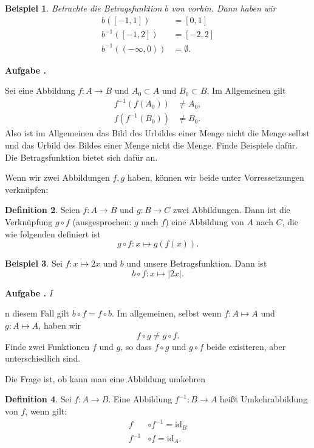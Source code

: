 \documentclass[a4paper,ngerman,12pt]{scrartcl}
\theoremstyle{definition}
\newtheorem{defn}{Definition}[section]
\newtheorem{bsp}[defn]{Beispiel}
\theoremstyle{plain}
\newtheorem{beispiel}[defn]{Beispiel}
\theoremstyle{remark}
\newlength{\aufgabenskip}
\newcounter{aufgabennummer}
\newenvironment{aufgabe}[1]{
  \addtocounter{aufgabennummer}{1}
  \textbf{Aufgabe \theaufgabennummer.} \emph{#1} \par
}{\vspace{\aufgabenskip}}
\begin{document}
\begin{beispiel}
Betrachte die Betragsfunktion $b$ von vorhin. Dann haben wir
\begin{align*}
b([-1,1]) &=  [0,1] \\
b^{-1}([-1,2]) &= [-2,2]\\
b^{-1}((-\infty, 0)) &= \emptyset.
\end{align*}
\end{beispiel}
\begin{aufgabe}\\
Sei eine Abbildung $f:A\longrightarrow B$ und  $A_0\subset A$ und $B_0\subset B$. Im Allgemeinen gilt 
\begin{align*}
f^{-1}\left(f\left(A_0\right)\right) &\neq A_0,\\
f\left(f^{-1}\left(B_0\right)\right) &\neq B_0.
\end{align*}
Also ist im Allgemeinen das Bild des Urbildes einer Menge nicht die Menge selbst und das Urbild des Bildes einer Menge nicht die Menge. Finde Beispiele dafür. Die Betragsfunktion bietet sich dafür an.
\end{aufgabe}

Wenn wir zwei Abbildungen $f,g$ haben, können wir beide unter Vorressetzungen verknüpfen:
\begin{defn}
Seien $f: A\longrightarrow B$ und $g: B\longrightarrow C$ zwei Abbildungen. Dann ist die Verknüpfung $g\circ f$ (ausgesprochen: $g$ nach $f$) eine Abbildung von $A$ nach $C$, die wie folgenden definiert ist
\[
g\circ f: x \mapsto g\left(f(x)\right).
\]
\end{defn}

\begin{bsp}
Sei $f:x\mapsto 2x$ und $b$ und unsere Betragsfunktion. Dann ist
\[
b\circ f: x\mapsto |2x|.
\]
\end{bsp}

\begin{aufgabe}
In diesem Fall gilt $b\circ f = f \circ b$. Im allgemeinen, selbst wenn $f:A\mapsto A$ und $g:A\mapsto A$, haben wir
\[
f\circ g \neq g \circ f.
\]
Finde zwei Funktionen $f$ und $g$, so dass $f\circ g$ und $g\circ f$ beide exisiteren, aber unterschiedlich sind. 
\end{aufgabe}

Die Frage ist, ob kann man eine Abbildung umkehren
\begin{defn}
Sei $f:A\longrightarrow B$. Eine Abbildung $f^{-1}:B\longrightarrow A$ heißt Umkehrabbildung von $f$, wenn gilt:
\begin{align*}
f&\circ f^{-1} = \text{id}_B\\
f^{-1}&\circ f = \text{id}_A.
\end{align*}
\end{defn}
\end{document}
